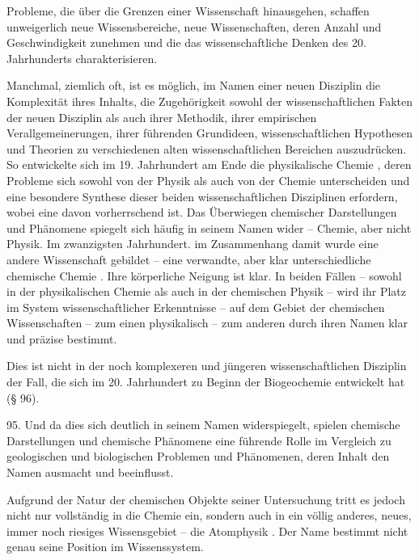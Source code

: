 \documentclass[11pt,a4paper]{book}
\begin{document}
Probleme, die über die Grenzen einer Wissenschaft hinausgehen, schaffen unweigerlich neue Wissensbereiche, neue Wissenschaften, deren Anzahl und Geschwindigkeit zunehmen und die das wissenschaftliche Denken des 20. Jahrhunderts charakterisieren.



Manchmal, ziemlich oft, ist es möglich, im Namen einer neuen Disziplin die Komplexität ihres Inhalts, die Zugehörigkeit sowohl der wissenschaftlichen Fakten der neuen Disziplin als auch ihrer Methodik, ihrer empirischen Verallgemeinerungen, ihrer führenden Grundideen, wissenschaftlichen Hypothesen und Theorien zu verschiedenen alten wissenschaftlichen Bereichen auszudrücken. So entwickelte sich im 19. Jahrhundert am Ende die physikalische Chemie , deren Probleme sich sowohl von der Physik als auch von der Chemie unterscheiden und eine besondere Synthese dieser beiden wissenschaftlichen Disziplinen erfordern, wobei eine davon vorherrschend ist. Das Überwiegen chemischer Darstellungen und Phänomene spiegelt sich häufig in seinem Namen wider -- Chemie, aber nicht Physik. Im zwanzigsten Jahrhundert. im Zusammenhang damit wurde eine andere Wissenschaft gebildet -- eine verwandte, aber klar unterschiedliche chemische Chemie . Ihre körperliche Neigung ist klar. In beiden Fällen -- sowohl in der physikalischen Chemie als auch in der chemischen Physik -- wird ihr Platz im System wissenschaftlicher Erkenntnisse -- auf dem Gebiet der chemischen Wissenschaften -- zum einen physikalisch -- zum anderen durch ihren Namen klar und präzise bestimmt.



Dies ist nicht in der noch komplexeren und jüngeren wissenschaftlichen Disziplin der Fall, die sich im 20. Jahrhundert zu Beginn der Biogeochemie entwickelt hat (§ 96).



95. Und da dies sich deutlich in seinem Namen widerspiegelt, spielen chemische Darstellungen und chemische Phänomene eine führende Rolle im Vergleich zu geologischen und biologischen Problemen und Phänomenen, deren Inhalt den Namen ausmacht und beeinflusst.



Aufgrund der Natur der chemischen Objekte seiner Untersuchung tritt es jedoch nicht nur vollständig in die Chemie ein, sondern auch in ein völlig anderes, neues, immer noch riesiges Wissensgebiet -- die Atomphysik . Der Name bestimmt nicht genau seine Position im Wissenssystem.
\end{document}
